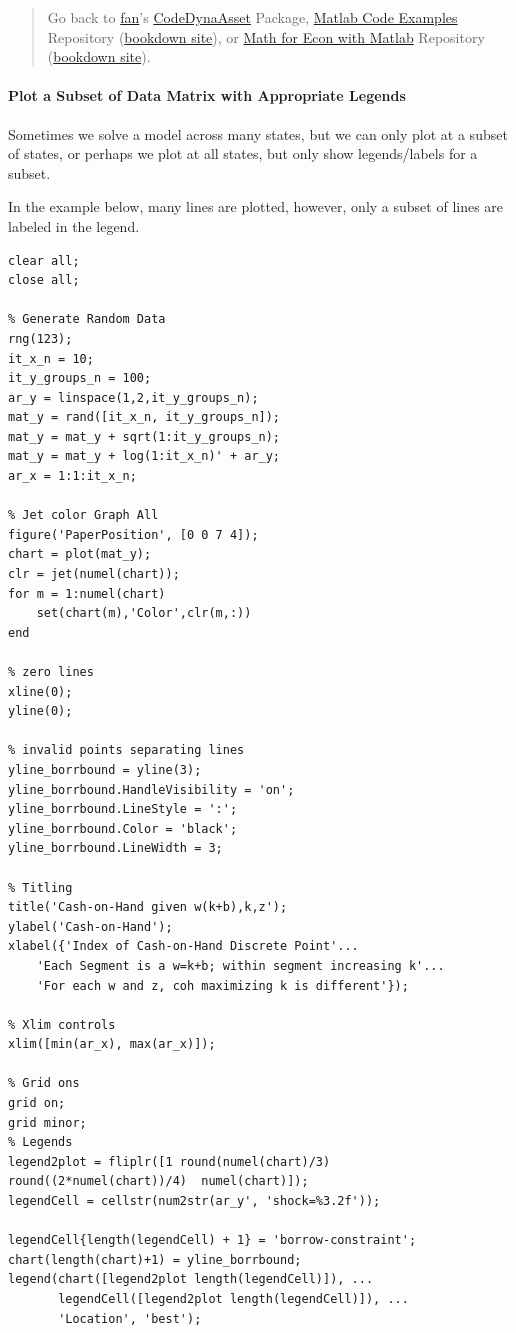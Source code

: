 \documentclass[
]{book}
\begin{document}
\begin{quote}
Go back to \href{http://fanwangecon.github.io/}{fan}'s \href{https://fanwangecon.github.io/CodeDynaAsset/}{CodeDynaAsset} Package, \href{https://fanwangecon.github.io/M4Econ/}{Matlab Code Examples} Repository (\href{https://fanwangecon.github.io/M4Econ/bookdown}{bookdown site}), or \href{https://fanwangecon.github.io/Math4Econ/}{Math for Econ with Matlab} Repository (\href{https://fanwangecon.github.io/Math4Econ/bookdown}{bookdown site}).
\end{quote}

\hypertarget{plot-a-subset-of-data-matrix-with-appropriate-legends}{%
\paragraph{Plot a Subset of Data Matrix with Appropriate Legends}\label{plot-a-subset-of-data-matrix-with-appropriate-legends}}

Sometimes we solve a model across many states, but we can only plot at a
subset of states, or perhaps we plot at all states, but only show
legends/labels for a subset.

In the example below, many lines are plotted, however, only a subset of
lines are labeled in the legend.

\begin{verbatim}
clear all;
close all;

% Generate Random Data
rng(123);
it_x_n = 10;
it_y_groups_n = 100;
ar_y = linspace(1,2,it_y_groups_n);
mat_y = rand([it_x_n, it_y_groups_n]);
mat_y = mat_y + sqrt(1:it_y_groups_n);
mat_y = mat_y + log(1:it_x_n)' + ar_y;
ar_x = 1:1:it_x_n;

% Jet color Graph All
figure('PaperPosition', [0 0 7 4]);
chart = plot(mat_y);
clr = jet(numel(chart));
for m = 1:numel(chart)
    set(chart(m),'Color',clr(m,:))
end

% zero lines
xline(0);
yline(0);

% invalid points separating lines
yline_borrbound = yline(3);
yline_borrbound.HandleVisibility = 'on';
yline_borrbound.LineStyle = ':';
yline_borrbound.Color = 'black';
yline_borrbound.LineWidth = 3;

% Titling
title('Cash-on-Hand given w(k+b),k,z');
ylabel('Cash-on-Hand');
xlabel({'Index of Cash-on-Hand Discrete Point'...
    'Each Segment is a w=k+b; within segment increasing k'...
    'For each w and z, coh maximizing k is different'});

% Xlim controls
xlim([min(ar_x), max(ar_x)]);

% Grid ons
grid on;
grid minor;
% Legends
legend2plot = fliplr([1 round(numel(chart)/3) round((2*numel(chart))/4)  numel(chart)]);
legendCell = cellstr(num2str(ar_y', 'shock=%3.2f'));

legendCell{length(legendCell) + 1} = 'borrow-constraint';
chart(length(chart)+1) = yline_borrbound;
legend(chart([legend2plot length(legendCell)]), ...
       legendCell([legend2plot length(legendCell)]), ...
       'Location', 'best');
\end{verbatim}
\end{document}
